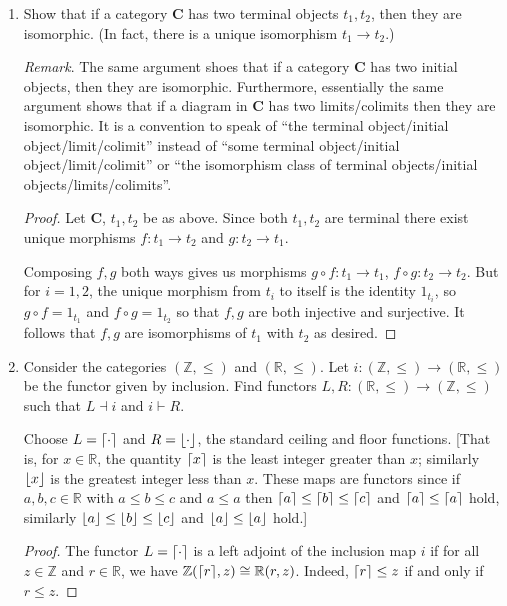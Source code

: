 \documentclass[11pt]{article}
\DeclarePairedDelimiter{\ceil}{\lceil}{\rceil}
\DeclarePairedDelimiter{\floor}{\lfloor}{\rfloor}
\begin{document}
\begin{enumerate}
    \item Show that if a category $\mathbf{C}$ has two terminal objects $t_1,t_2$, then they are isomorphic. (In fact, there is a unique isomorphism $t_1\to t_2$.)
    
    \textit{Remark}. The same argument shoes that if a category $\mathbf{C}$ has two initial objects, then they are isomorphic. Furthermore, essentially the same argument shows that if a diagram in $\mathbf{C}$ has two limits/colimits then they are isomorphic. It is a convention to speak of ``the terminal object/initial object/limit/colimit'' instead of ``some terminal object/initial object/limit/colimit'' or ``the isomorphism class of terminal objects/initial objects/limits/colimits''. \begin{proof}
      Let $\mathbf{C}$, $t_1,t_2$ be as above. Since both $t_1,t_2$ are terminal there exist unique morphisms $f\colon t_1\to t_2$ and $g\colon t_2\to t_1$.

      Composing $f,g$ both ways gives us morphisms $g\circ f\colon t_1\to t_1$, $f\circ g\colon t_2\to t_2$. But for $i = 1,2$, the unique morphism from $t_i$ to itself is the identity $1_{t_i}$, so $g\circ f = 1_{t_1}$ and $f\circ g = 1_{t_2}$ so that $f,g$ are both injective and surjective. It follows that $f,g$ are isomorphisms of $t_1$ with $t_2$ as desired.
    \end{proof}
    \item Consider the categories $(\mathbb{Z},\leq)$ and $(\mathbb{R},\leq)$. Let $i\colon(\mathbb{Z},\leq)\to (\mathbb{R},\leq)$ be the functor given by inclusion. Find functors $L,R\colon (\mathbb{R},\leq)\to (\mathbb{Z},\leq)$ such that $L\dashv i$ and $i\vdash R$.
    
    Choose $L=\ceil{\cdot}$ and $R=\floor{\cdot}$, the standard ceiling and floor functions. [That is, for $x\in \mathbb{R}$, the quantity $\ceil{x}$ is the least integer greater than $x$; similarly $\floor{x}$ is the greatest integer less than $x$. These maps are functors since if $a,b,c\in\mathbb{R}$ with $a\leq b\leq c$ and $a\leq a$ then $\ceil a\leq \ceil b\leq \ceil c$ and $\ceil a \leq \ceil a$ hold, similarly $\floor a\leq \floor b\leq \floor c$ and $\floor a\leq \floor a$ hold.] \begin{proof}
      The functor $L=\ceil{\cdot}$ is a left adjoint of the inclusion map $i$ if for all $z\in\mathbb{Z}$ and $r\in \mathbb{R}$, we have $\mathbb{Z}(\ceil r, z)\cong \mathbb{R}(r,z)$. Indeed, $\ceil r\leq z$ if and only if $r\leq z$.


\end{proof}
\end{enumerate}
\end{document}
